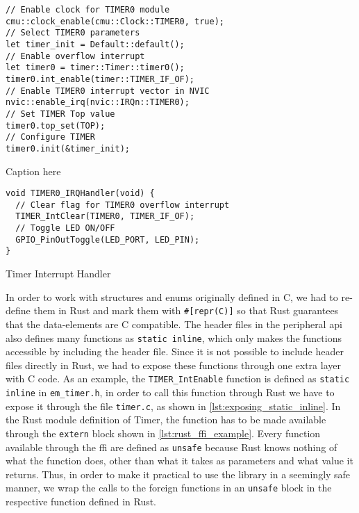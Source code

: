 \begin{listing}[tb]
\begin{verbatim}
// Enable clock for TIMER0 module
cmu::clock_enable(cmu::Clock::TIMER0, true);
// Select TIMER0 parameters
let timer_init = Default::default();
// Enable overflow interrupt
let timer0 = timer::Timer::timer0();
timer0.int_enable(timer::TIMER_IF_OF);
// Enable TIMER0 interrupt vector in NVIC
nvic::enable_irq(nvic::IRQn::TIMER0);
// Set TIMER Top value
timer0.top_set(TOP);
// Configure TIMER
timer0.init(&timer_init);
\end{verbatim}
\caption{Caption here}
\label{lst:timer_program_rust}
\end{listing}

\begin{listing}[tb]
\begin{verbatim}
void TIMER0_IRQHandler(void) {
  // Clear flag for TIMER0 overflow interrupt
  TIMER_IntClear(TIMER0, TIMER_IF_OF);
  // Toggle LED ON/OFF
  GPIO_PinOutToggle(LED_PORT, LED_PIN);
}
\end{verbatim}
\caption{Timer Interrupt Handler}
\label{lst:timer_interrupt_handler}
\end{listing}

In order to work with structures and enums originally defined in C, we had to re-define them in Rust and mark them with \texttt{\#[repr(C)]} so that Rust guarantees that the data-elements are C compatible.
The header files in the peripheral \gls{api} also defines many functions as \texttt{static inline}, which only makes the functions accessible by including the header file.
Since it is not possible to include header files directly in Rust, we had to expose these functions through one extra layer with C code.
As an example, the \texttt{TIMER\_IntEnable} function is defined as \texttt{static inline} in \texttt{em\_timer.h}, in order to call this function through Rust we have to expose it through the file \texttt{timer.c}, as shown in \autoref{lst:exposing_static_inline}.
In the Rust module definition of Timer, the function has to be made available through the \texttt{extern} block shown in \autoref{lst:rust_ffi_example}.
Every function available through the \gls{ffi} are defined as \texttt{unsafe} because Rust knows nothing of what the function does, other than what it takes as parameters and what value it returns.
Thus, in order to make it practical to use the library in a seemingly safe manner, we wrap the calls to the foreign functions in an \texttt{unsafe} block in the respective function defined in Rust.

